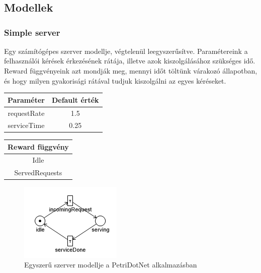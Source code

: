 \appendix
\chapter*{\fuggelek}
\setcounter{chapter}{\appendixnumber}

\section{Modellek}
\label{sec:fuggelek}
\subsection{Simple server}

Egy számítógépes szerver modellje, végtelenül leegyszerűsítve. Paramétereink a felhasználói kérések érkezésének rátája, illetve azok kiszolgálásához szükséges idő. Reward függvényeink azt mondják meg, mennyi időt töltünk várakozó állapotban, és hogy milyen gyakorisági rátával tudjuk kiszolgálni az egyes kéréseket.
\begin{center}
	\begin{tabular}{cc}
		\textbf{\textbf{Paraméter}} & \textbf{Default érték} \\
		\hline
		requestRate & 1.5\\
		serviceTime & 0.25\\
	\end{tabular}
	\label{table:filparam}
	\quad
	\begin{tabular}{c}
		\textbf{\textbf{Reward függvény}}\\
		\hline
		Idle\\
		ServedRequests\\
	\end{tabular}
	\label{table:filrewards}
\end{center}
\begin{figure}[!ht]
	\centering
	\includegraphics{figures/smpl.png}
	\caption{Egyszerű szerver modellje a PetriDotNet alkalmazásban}
\end{figure}
\clearpage
